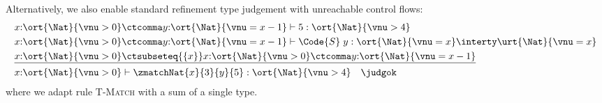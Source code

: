 \begin{example}
Alternatively, we also enable standard refinement type judgement with unreachable control flows:
\begin{align*}
  &x{:}\ort{\Nat}{\vnu > 0} \ctcomma y{:}\ort{\Nat}{\vnu = x - 1}\vdash 5 : \ort{\Nat}{\vnu > 4}
  \\&x{:}\ort{\Nat}{\vnu > 0} \ctcomma y{:}\ort{\Nat}{\vnu = x - 1}\vdash \Code{S}\;y : \ort{\Nat}{\vnu = x} \interty \urt{\Nat}{\vnu = x}
  \\&\underline{x{:}\ort{\Nat}{\vnu > 0} \ctsubseteq{\{x\}} x{:}\ort{\Nat}{\vnu > 0} \ctcomma y{:}\ort{\Nat}{\vnu = x - 1}}
  \\&x{:}\ort{\Nat}{\vnu > 0} \vdash \zmatchNat{x}{3}{y}{5} : \ort{\Nat}{\vnu > 4} \quad \judgok
\end{align*}\noindent
where we adapt rule \textsc{T-Match} with a sum of a single type.
\end{example}
